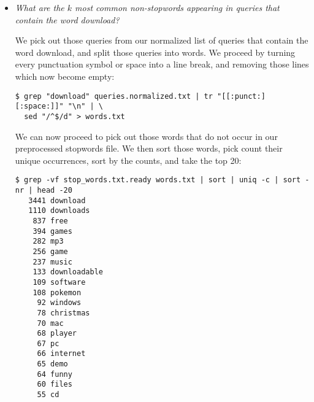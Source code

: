 \begin{itemize}
In order to use \texttt{grep} to find queries containing words in the word
list, we also need to preprocess the word list. We need to remove carriage
returns, as well as prefix and postfix every line with \texttt{\textbackslash}
indicating a word boundary. Indeed, every line should be a well-formed regular
expression.

\begin{lstlisting}
$ cat stop_words.txt | tr -d '\r' | sed 's/^\(.*\)$/\\b\1\\b/g' > stop_words.txt.ready
\end{lstlisting}

We can now proceed to use grep to count queries containing stop words:

\begin{lstlisting}
$ grep -f stop_words.txt.ready queries.normalized.txt | wc -l
274864
\end{lstlisting}

So $23.574\%$ of the queries contain stop words.

\item \emph{What are the $k$ most common non-stopwords appearing in queries
that contain the word download?}

We pick out those queries from our normalized list of queries that contain the
word download, and split those queries into words. We proceed by turning every
punctuation symbol or space into a line break, and removing those lines which
now become empty:

\begin{lstlisting}
$ grep "download" queries.normalized.txt | tr "[[:punct:][:space:]]" "\n" | \
  sed "/^$/d" > words.txt
\end{lstlisting}

We can now proceed to pick out those words that do not occur in our
preprocessed stopwords file. We then sort those words, pick count their unique
occurrences, sort by the counts, and take the top 20:

\begin{lstlisting}
$ grep -vf stop_words.txt.ready words.txt | sort | uniq -c | sort -nr | head -20
   3441 download
   1110 downloads
    837 free
    394 games
    282 mp3
    256 game
    237 music
    133 downloadable
    109 software
    108 pokemon
     92 windows
     78 christmas
     70 mac
     68 player
     67 pc
     66 internet
     65 demo
     64 funny
     60 files
     55 cd
\end{lstlisting}


\end{itemize}
